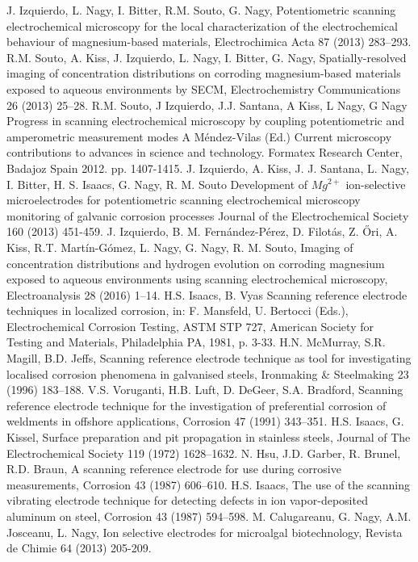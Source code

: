 \documentclass[3p]{elsarticle}
\begin{document}
\begin{thebibliography}{5}
J. Izquierdo, L. Nagy, I. Bitter, R.M. Souto, G. Nagy, 
Potentiometric scanning electrochemical microscopy for the local characterization of the electrochemical behaviour of magnesium-based materials, Electrochimica Acta 87 (2013) 283–293.
R.M. Souto, A. Kiss, J. Izquierdo, L. Nagy, I. Bitter, G. Nagy, Spatially-resolved imaging of concentration distributions on corroding magnesium-based materials exposed to aqueous environments by SECM, Electrochemistry Communications 26 (2013) 25–28.
R.M. Souto, J Izquierdo, J.J. Santana, A Kiss, L Nagy, G Nagy 
Progress in scanning electrochemical microscopy by coupling potentiometric and amperometric measurement modes
A Méndez-Vilas (Ed.)
Current microscopy contributions to advances in science and technology. Formatex Research Center, Badajoz Spain 2012. pp. 1407-1415.
J. Izquierdo, A. Kiss, J. J. Santana, L. Nagy, I. Bitter, H. S. Isaacs, G. Nagy, R. M. Souto
Development of $Mg^{2+}$ ion-selective microelectrodes for potentiometric scanning electrochemical microscopy monitoring of galvanic corrosion processes
Journal of the Electrochemical Society  160 (2013) 451-459. 
J. Izquierdo, B. M. Fernández-Pérez, D. Filotás, Z. Őri, A. Kiss, R.T. Martín-Gómez, L. Nagy, G. Nagy, R. M. Souto, Imaging of concentration distributions and hydrogen evolution on corroding magnesium exposed to aqueous environments using scanning electrochemical microscopy, Electroanalysis 28 (2016) 1–14.
H.S. Isaacs, B. Vyas Scanning reference electrode techniques in localized corrosion, in: F. Mansfeld, U. Bertocci (Eds.), Electrochemical Corrosion Testing, ASTM STP 727, American Society for Testing and Materials, Philadelphia PA, 1981, p. 3-33.
H.N. McMurray, S.R. Magill, B.D. Jeffs, Scanning reference electrode technique as tool for investigating localised corrosion phenomena in galvanised steels, Ironmaking \& Steelmaking 23 (1996) 183–188.
V.S. Voruganti, H.B. Luft, D. DeGeer, S.A. Bradford, Scanning reference electrode technique for the investigation of preferential corrosion of weldments in offshore applications, Corrosion 47 (1991) 343–351.
H.S. Isaacs, G. Kissel, Surface preparation and pit propagation in stainless steels, Journal of The Electrochemical Society 119 (1972) 1628–1632.
N. Hsu, J.D. Garber, R. Brunel, R.D. Braun, A scanning reference electrode for use during corrosive measurements, Corrosion 43 (1987) 606–610.
H.S. Isaacs, The use of the scanning vibrating electrode technique for detecting defects in ion vapor-deposited aluminum on steel, Corrosion 43 (1987) 594–598.
 M. Calugareanu, G. Nagy, A.M. Josceanu, L. Nagy, Ion selective electrodes for microalgal biotechnology, Revista de Chimie 64 (2013) 205-209.


\end{thebibliography}
\end{document}
